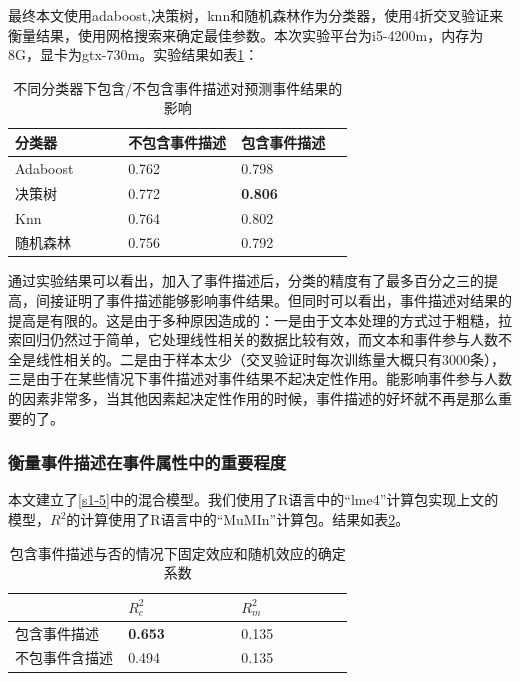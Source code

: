 最终本文使用adaboost,决策树，knn和随机森林作为分类器，使用4折交叉验证来衡量结果，使用网格搜索来确定最佳参数。本次实验平台为i5-4200m，内存为8G，显卡为gtx-730m。实验结果如表\ref{t1-3}：

\begin{table}[htbp] 
  \centering
  \caption{\label{t1-3}不同分类器下包含/不包含事件描述对预测事件结果的影响}
  \begin{tabular*}{\linewidth}{p{0.33\linewidth}p{0.33\linewidth}p{0.33\linewidth}}
\toprule 
分类器&不包含事件描述&包含事件描述\\
\midrule
Adaboost & 0.762 & 0.798 \\
决策树& 0.772 & \textbf{0.806} \\
Knn & 0.764 & 0.802  \\
随机森林 & 0.756 & 0.792 \\
\bottomrule
  \end{tabular*}
\end{table}

通过实验结果可以看出，加入了事件描述后，分类的精度有了最多百分之三的提高，间接证明了事件描述能够影响事件结果。但同时可以看出，事件描述对结果的提高是有限的。这是由于多种原因造成的：一是由于文本处理的方式过于粗糙，拉索回归仍然过于简单，它处理线性相关的数据比较有效，而文本和事件参与人数不全是线性相关的。二是由于样本太少（交叉验证时每次训练量大概只有3000条），三是由于在某些情况下事件描述对事件结果不起决定性作用。能影响事件参与人数的因素非常多，当其他因素起决定性作用的时候，事件描述的好坏就不再是那么重要的了。

\subsubsection{衡量事件描述在事件属性中的重要程度}
本文建立了\ref{s1-5}中的混合模型。我们使用了R语言中的``lme4''计算包\citep{lme4}实现上文的模型，\(R^2\)的计算使用了R语言中的``MuMIn''计算包\citep{MuMIn}。结果如表\ref{t1-4}。

\begin{table}[htbp]
  \caption{\label{t1-4}包含事件描述与否的情况下固定效应和随机效应的确定系数}
	\centering  
    \begin{tabular*}{\linewidth}{p{0.33\linewidth}p{0.33\linewidth}p{0.33\linewidth}}
  \toprule
    &  \(R_c^2\) & \(R_m^2\) \\ 
  \midrule
		包含事件描述                       & \textbf{0.653} & 0.135 \\ 
    不包事件含描述                        & 0.494 & 0.135 \\ 
  \bottomrule
    \end{tabular*}
\end{table}

